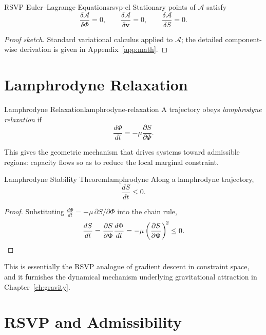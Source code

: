 \documentclass[12pt,twoside,openright]{book}
\begin{document}
\begin{theorem}{RSVP Euler--Lagrange Equations}{rsvp-el}
  Stationary points of $\mathcal{A}$ satisfy
  \[
    \frac{\delta\mathcal{A}}{\delta\Phi} = 0,
    \qquad
    \frac{\delta\mathcal{A}}{\delta\mathbf{v}} = 0,
    \qquad
    \frac{\delta\mathcal{A}}{\delta S} = 0.
  \]
\end{theorem}

\begin{proof}[Proof sketch]
  Standard variational calculus applied to $\mathcal{A}$;
  the detailed component-wise derivation is given in
  Appendix~\ref{app:math}.
\end{proof}

\section{Lamphrodyne Relaxation}
\label{sec:ch16-lamphrodyne}

\begin{definition}{Lamphrodyne Relaxation}{lamphrodyne-relaxation}
  A trajectory obeys \emph{lamphrodyne relaxation} if
  \[
    \frac{d\Phi}{dt}
    = -\mu \frac{\partial S}{\partial \Phi}.
  \]
\end{definition}

This gives the geometric mechanism that drives systems
toward admissible regions: capacity flows so as to reduce
the local marginal constraint.

\begin{theorem}{Lamphrodyne Stability Theorem}{lamphrodyne}
  Along a lamphrodyne trajectory,
  \[
    \frac{dS}{dt} \le 0.
  \]
\end{theorem}

\begin{proof}
  Substituting $\frac{d\Phi}{dt} = -\mu\,\partial S/\partial\Phi$
  into the chain rule,
  \[
    \frac{dS}{dt}
    = \frac{\partial S}{\partial \Phi}\frac{d\Phi}{dt}
    = -\mu \left(\frac{\partial S}{\partial \Phi}\right)^{\!2}
    \le 0. \qedhere
  \]
\end{proof}

This is essentially the RSVP analogue of gradient descent
in constraint space, and it furnishes the dynamical
mechanism underlying gravitational attraction in
Chapter~\ref{ch:gravity}.

\section{RSVP and Admissibility}
\label{sec:ch16-admissibility}
\end{document}
